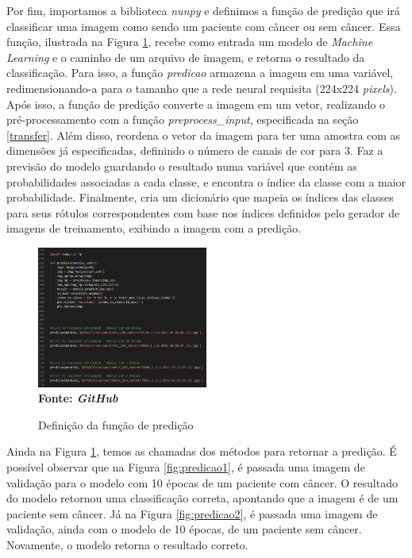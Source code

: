 Por fim, importamos a biblioteca \textit{nunpy} e definimos a função de predição que irá classificar uma imagem como sendo um paciente com câncer ou sem câncer. Essa função, ilustrada na Figura \ref{fig:predicao}, recebe como entrada um modelo de \textit{Machine Learning} e o caminho de um arquivo de imagem, e retorna o resultado da classificação. Para isso, a função \textit{predicao} armazena a imagem em uma variável, redimensionando-a para o tamanho que a rede neural requisita (224x224 \textit{pixels}). Após isso, a função de predição converte a imagem em um vetor, realizando o pré-processamento com a função  \textit{preprocess\_input}, especificada na seção \ref{transfer}. Além disso, reordena o vetor da imagem para ter uma amostra com as dimensões já especificadas, definindo o número de canais de cor para 3. Faz a previsão do modelo guardando o resultado numa variável que contém as probabilidades associadas a cada classe, e encontra o índice da classe com a maior probabilidade. Finalmente, cria um dicionário que mapeia os índices das classes para seus rótulos correspondentes com base nos índices definidos pelo gerador de imagens de treinamento, exibindo a imagem com a predição.


\begin{figure}[ht]
 	\centering	
 	\caption[\hspace{0.1cm}Grade Computacional.]{Definição da função de predição}
 	\vspace{-0.4cm}
 	\includegraphics[width=0.5\textwidth]{figuras/predicao.png}
 	\captionsetup{justification=centering}
	\vspace{-0.2cm}
     \\\textbf{\footnotesize Fonte: \textit{GitHub}}
	\label{fig:predicao}
\end{figure}


Ainda na Figura \ref{fig:predicao}, temos as chamadas dos métodos para retornar a predição. É possível observar que na Figura \ref{fig:predicao1}, é passada uma imagem de validação para o modelo com 10 épocas de um paciente com câncer. O resultado do modelo retornou uma classificação correta, apontando que a imagem é de um paciente sem câncer. Já na Figura \ref{fig:predicao2}, é passada uma imagem de validação, ainda com o modelo de 10 épocas, de um paciente sem câncer. Novamente, o modelo retorna o resultado correto.

